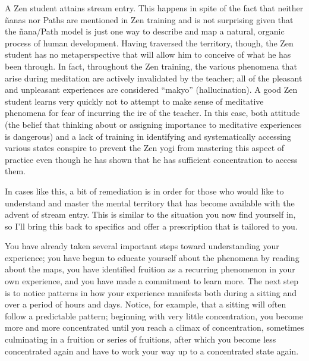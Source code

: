 \documentclass[a5paper,10pt,english]{book}
\begin{document}
\sphinxAtStartPar
A Zen student attains stream entry. This happens in spite of the fact
that neither ñanas nor Paths are mentioned in Zen training and is not
surprising given that the ñana/Path model is just one way to describe
and map a natural, organic process of human development. Having
traversed the territory, though, the Zen student has no meta\sphinxhyphen{}perspective
that will allow him to conceive of what he has been through. In fact,
throughout the Zen training, the various phenomena that arise during
meditation are actively invalidated by the teacher; all of the pleasant
and unpleasant experiences are considered “makyo” (hallucination). A
good Zen student learns very quickly not to attempt to make sense of
meditative phenomena for fear of incurring the ire of the teacher. In
this case, both attitude (the belief that thinking about or assigning
importance to meditative experiences is dangerous) and a lack of
training in identifying and systematically accessing various states
conspire to prevent the Zen yogi from mastering this aspect of practice
even though he has shown that he has sufficient concentration to access
them.

\sphinxAtStartPar
In cases like this, a bit of remediation is in order for those who would
like to understand and master the mental territory that has become
available with the advent of stream entry. This is similar to the
situation you now find yourself in, so I’ll bring this back to specifics
and offer a prescription that is tailored to you.

\sphinxAtStartPar
You have already taken several important steps toward understanding your
experience; you have begun to educate yourself about the phenomena by
reading about the maps, you have identified fruition as a recurring
phenomenon in your own experience, and you have made a commitment to
learn more. The next step is to notice patterns in how your experience
manifests both during a sitting and over a period of hours and days.
Notice, for example, that a sitting will often follow a predictable
pattern; beginning with very little concentration, you become more and
more concentrated until you reach a climax of concentration, sometimes
culminating in a fruition or series of fruitions, after which you become
less concentrated again and have to work your way up to a concentrated
state again.
\end{document}
